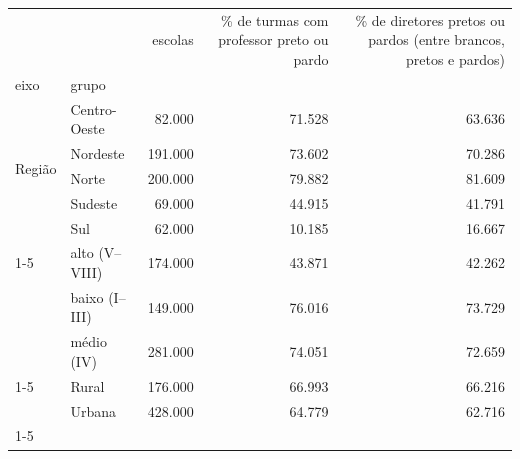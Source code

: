 \begin{tabular}{llrrr}
\toprule
 &  & escolas & \% de turmas com professor preto ou pardo & \% de diretores pretos ou pardos (entre brancos, pretos e pardos) \\
eixo & grupo &  &  &  \\
\midrule
\multirow[t]{5}{*}{Região} & Centro-Oeste & 82.000 & 71.528 & 63.636 \\
 & Nordeste & 191.000 & 73.602 & 70.286 \\
 & Norte & 200.000 & 79.882 & 81.609 \\
 & Sudeste & 69.000 & 44.915 & 41.791 \\
 & Sul & 62.000 & 10.185 & 16.667 \\
\cline{1-5}
\multirow[t]{3}{*}{Faixa de INSE} & alto (V–VIII) & 174.000 & 43.871 & 42.262 \\
 & baixo (I–III) & 149.000 & 76.016 & 73.729 \\
 & médio (IV) & 281.000 & 74.051 & 72.659 \\
\cline{1-5}
\multirow[t]{2}{*}{Localização} & Rural & 176.000 & 66.993 & 66.216 \\
 & Urbana & 428.000 & 64.779 & 62.716 \\
\cline{1-5}
\bottomrule
\end{tabular}
